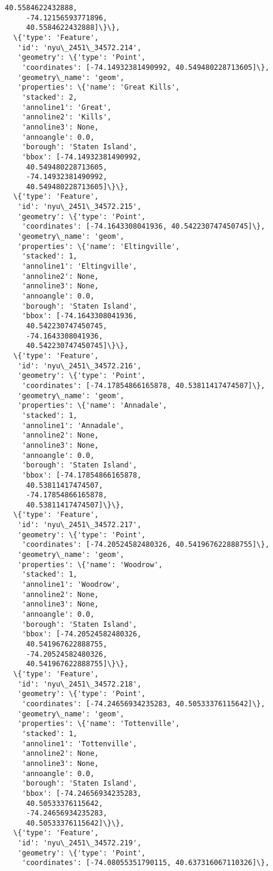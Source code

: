 \documentclass[11pt]{article}
\begin{document}
\begin{tcolorbox}[breakable, size=fbox, boxrule=.5pt, pad at break*=1mm, opacityfill=0]
\begin{Verbatim}[commandchars=\\\{\}]
     40.5584622432888,
     -74.12156593771896,
     40.5584622432888]\}\},
  \{'type': 'Feature',
   'id': 'nyu\_2451\_34572.214',
   'geometry': \{'type': 'Point',
    'coordinates': [-74.14932381490992, 40.549480228713605]\},
   'geometry\_name': 'geom',
   'properties': \{'name': 'Great Kills',
    'stacked': 2,
    'annoline1': 'Great',
    'annoline2': 'Kills',
    'annoline3': None,
    'annoangle': 0.0,
    'borough': 'Staten Island',
    'bbox': [-74.14932381490992,
     40.549480228713605,
     -74.14932381490992,
     40.549480228713605]\}\},
  \{'type': 'Feature',
   'id': 'nyu\_2451\_34572.215',
   'geometry': \{'type': 'Point',
    'coordinates': [-74.1643308041936, 40.542230747450745]\},
   'geometry\_name': 'geom',
   'properties': \{'name': 'Eltingville',
    'stacked': 1,
    'annoline1': 'Eltingville',
    'annoline2': None,
    'annoline3': None,
    'annoangle': 0.0,
    'borough': 'Staten Island',
    'bbox': [-74.1643308041936,
     40.542230747450745,
     -74.1643308041936,
     40.542230747450745]\}\},
  \{'type': 'Feature',
   'id': 'nyu\_2451\_34572.216',
   'geometry': \{'type': 'Point',
    'coordinates': [-74.17854866165878, 40.53811417474507]\},
   'geometry\_name': 'geom',
   'properties': \{'name': 'Annadale',
    'stacked': 1,
    'annoline1': 'Annadale',
    'annoline2': None,
    'annoline3': None,
    'annoangle': 0.0,
    'borough': 'Staten Island',
    'bbox': [-74.17854866165878,
     40.53811417474507,
     -74.17854866165878,
     40.53811417474507]\}\},
  \{'type': 'Feature',
   'id': 'nyu\_2451\_34572.217',
   'geometry': \{'type': 'Point',
    'coordinates': [-74.20524582480326, 40.541967622888755]\},
   'geometry\_name': 'geom',
   'properties': \{'name': 'Woodrow',
    'stacked': 1,
    'annoline1': 'Woodrow',
    'annoline2': None,
    'annoline3': None,
    'annoangle': 0.0,
    'borough': 'Staten Island',
    'bbox': [-74.20524582480326,
     40.541967622888755,
     -74.20524582480326,
     40.541967622888755]\}\},
  \{'type': 'Feature',
   'id': 'nyu\_2451\_34572.218',
   'geometry': \{'type': 'Point',
    'coordinates': [-74.24656934235283, 40.50533376115642]\},
   'geometry\_name': 'geom',
   'properties': \{'name': 'Tottenville',
    'stacked': 1,
    'annoline1': 'Tottenville',
    'annoline2': None,
    'annoline3': None,
    'annoangle': 0.0,
    'borough': 'Staten Island',
    'bbox': [-74.24656934235283,
     40.50533376115642,
     -74.24656934235283,
     40.50533376115642]\}\},
  \{'type': 'Feature',
   'id': 'nyu\_2451\_34572.219',
   'geometry': \{'type': 'Point',
    'coordinates': [-74.08055351790115, 40.637316067110326]\},

\end{Verbatim}
\end{tcolorbox}
\end{document}
